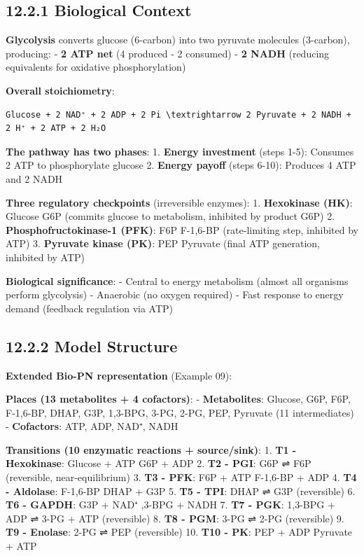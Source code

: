 \hypertarget{biological-context}{%
\subsection{12.2.1 Biological Context}\label{biological-context}}

\textbf{Glycolysis} converts glucose (6-carbon) into two pyruvate
molecules (3-carbon), producing: - \textbf{2 ATP net} (4 produced - 2
consumed) - \textbf{2 NADH} (reducing equivalents for oxidative
phosphorylation)

\textbf{Overall stoichiometry}:

\begin{lstlisting}
Glucose + 2 NAD⁺ + 2 ADP + 2 Pi \textrightarrow 2 Pyruvate + 2 NADH + 2 H⁺ + 2 ATP + 2 H₂O
\end{lstlisting}

\textbf{The pathway has two phases}: 1. \textbf{Energy investment}
(steps 1-5): Consumes 2 ATP to phosphorylate glucose 2. \textbf{Energy
payoff} (steps 6-10): Produces 4 ATP and 2 NADH

\textbf{Three regulatory checkpoints} (irreversible enzymes): 1.
\textbf{Hexokinase (HK)}: Glucose \textrightarrow G6P (commits glucose to metabolism,
inhibited by product G6P) 2. \textbf{Phosphofructokinase-1 (PFK)}: F6P \textrightarrow
F-1,6-BP (rate-limiting step, inhibited by ATP) 3. \textbf{Pyruvate
kinase (PK)}: PEP \textrightarrow Pyruvate (final ATP generation, inhibited by ATP)

\textbf{Biological significance}: - Central to energy metabolism (almost
all organisms perform glycolysis) - Anaerobic (no oxygen required) -
Fast response to energy demand (feedback regulation via ATP)

\hypertarget{model-structure}{%
\subsection{12.2.2 Model Structure}\label{model-structure}}

\textbf{Extended Bio-PN representation} (Example 09):

\textbf{Places (13 metabolites + 4 cofactors)}: - \textbf{Metabolites}:
Glucose, G6P, F6P, F-1,6-BP, DHAP, G3P, 1,3-BPG, 3-PG, 2-PG, PEP,
Pyruvate (11 intermediates) - \textbf{Cofactors}: ATP, ADP, NAD⁺, NADH

\textbf{Transitions (10 enzymatic reactions + source/sink)}: 1.
\textbf{T1 - Hexokinase}: Glucose + ATP \textrightarrow G6P + ADP 2. \textbf{T2 -
PGI}: G6P ⇌ F6P (reversible, near-equilibrium) 3. \textbf{T3 - PFK}: F6P
+ ATP \textrightarrow F-1,6-BP + ADP 4. \textbf{T4 - Aldolase}: F-1,6-BP \textrightarrow DHAP + G3P
5. \textbf{T5 - TPI}: DHAP ⇌ G3P (reversible) 6. \textbf{T6 - GAPDH}:
G3P + NAD⁺ ,3-BPG + NADH 7. \textbf{T7 - PGK}: 1,3-BPG + ADP ⇌ 3-PG +
ATP (reversible) 8. \textbf{T8 - PGM}: 3-PG ⇌ 2-PG (reversible) 9.
\textbf{T9 - Enolase}: 2-PG ⇌ PEP (reversible) 10. \textbf{T10 - PK}:
PEP + ADP \textrightarrow Pyruvate + ATP

